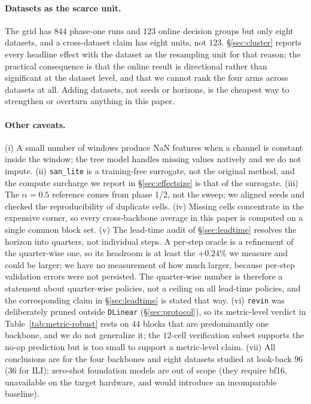 \documentclass[a4paper,fleqn]{cas-sc}
\newcommand{\arm}[1]{\texttt{#1}}
\begin{document}
\paragraph{Datasets as the scarce unit.}
The grid has $844$ phase-one runs and $123$ online decision groups but only eight
datasets, and a cross-dataset claim has eight units, not $123$.
\S\ref{sec:cluster} reports every headline effect with the dataset as the
resampling unit for that reason; the practical consequence is that the online
result is directional rather than significant at the dataset level, and that we
cannot rank the four arms across datasets at all. Adding datasets, not seeds or
horizons, is the cheapest way to strengthen or overturn anything in this paper.

\paragraph{Other caveats.}
(i) A small number of windows produce NaN features when a channel is constant
inside the window; the tree model handles missing values natively and we do not
impute. (ii) \arm{san\_lite} is a training-free surrogate, not the original
method, and the compute surcharge we report in \S\ref{sec:effectsize} is that of
the surrogate. (iii) The $\alpha{=}0.5$ reference comes from phase 1/2, not the
sweep; we aligned seeds and checked the reproducibility of duplicate cells.
(iv) Missing cells concentrate in the expensive corner, so every cross-backbone
average in this paper is computed on a single common block set.
(v) The lead-time audit of \S\ref{sec:leadtime} resolves the horizon into
quarters, not individual steps. A per-step oracle is a refinement of the
quarter-wise one, so its headroom is at least the $+0.24\%$ we measure and could be
larger; we have no measurement of how much larger, because per-step validation
errors were not persisted. The quarter-wise number is therefore a statement about
quarter-wise policies, not a ceiling on all lead-time policies, and the
corresponding claim in \S\ref{sec:leadtime} is stated that way.
(vi) \arm{revin} was deliberately pruned outside \arm{DLinear}
(\S\ref{sec:protocol}), so its metric-level verdict in
Table~\ref{tab:metric-robust} rests on $44$ blocks that are predominantly one
backbone, and we do not generalize it; the $12$-cell verification subset supports
the no-op prediction but is too small to support a metric-level claim.
(vii) All conclusions are for the four backbones and eight datasets studied at
look-back $96$ ($36$ for ILI); zero-shot foundation models are out of scope
(they require bf16, unavailable on the target hardware, and would introduce an
incomparable baseline).
\end{document}
